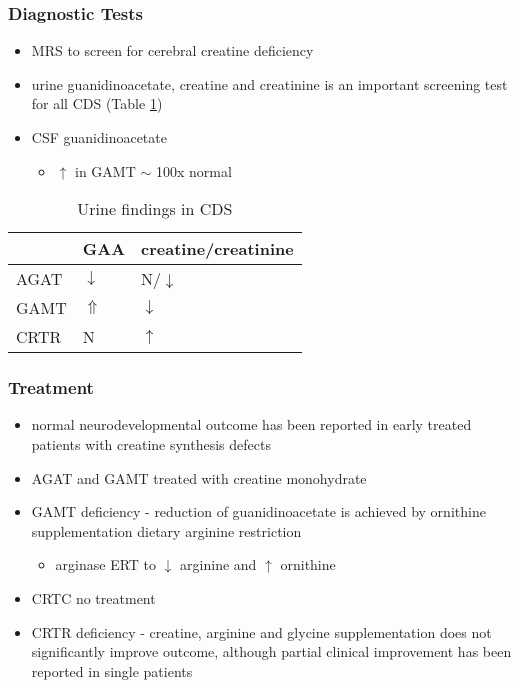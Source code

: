\documentclass[12pt]{scrartcl}
\begin{document}
\subsubsection{Diagnostic Tests}
\label{sec:org37a46dd}
\begin{itemize}
\item MRS to screen for cerebral creatine deficiency
\item urine guanidinoacetate, creatine and creatinine is an important
screening test for all CDS (Table \ref{tab:orgb6d92df})
\item CSF guanidinoacetate
\begin{itemize}
\item \(\uparrow\) in GAMT \(\sim\) 100x normal
\end{itemize}
\end{itemize}



\begin{table}[htbp]
\caption{\label{tab:orgb6d92df}Urine findings in CDS}
\centering
\begin{tabular}{lll}
 & GAA & creatine/creatinine\\
\hline
AGAT & \(\downarrow\) & N/\(\downarrow\)\\
GAMT & \(\Uparrow\) & \(\downarrow\)\\
CRTR & N & \(\uparrow\)\\
\end{tabular}
\end{table}

\subsubsection{Treatment}
\label{sec:org17f780e}
\begin{itemize}
\item normal neurodevelopmental outcome has been reported in early treated
patients with creatine synthesis defects
\item AGAT and GAMT treated with creatine monohydrate
\item GAMT deficiency - reduction of guanidinoacetate is achieved by
ornithine supplementation \textpm{} dietary arginine restriction
\begin{itemize}
\item arginase ERT to \(\downarrow\) arginine and \(\uparrow\) ornithine
\end{itemize}
\item CRTC no treatment
\item CRTR deficiency - creatine, arginine and glycine supplementation
does not significantly improve outcome, although partial clinical
improvement has been reported in single patients
\end{itemize}
\end{document}
